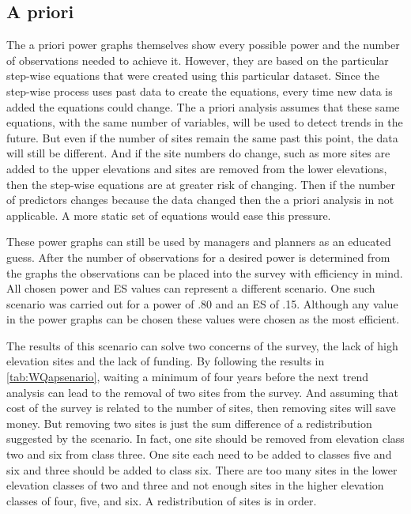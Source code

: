 \subsection{A priori}%

The a priori power graphs themselves show every possible power and the number of observations needed to achieve it.
However, they are based on the particular step-wise equations that were created using this particular dataset.
Since the step-wise process uses past data to create the equations, every time new data is added the equations could change.
The a priori analysis assumes that these same equations, with the same number of variables, will be used to detect trends in the future.
But even if the number of sites remain the same past this point, the data will still be different.
And if the site numbers do change, such as more sites are added to the upper elevations and sites are removed from the lower elevations, then the step-wise equations are at greater risk of changing.
Then if the number of predictors changes because the data changed then the a priori analysis in not applicable.
A more static set of equations would ease this pressure.

These power graphs can still be used by managers and planners as an educated guess.
After the number of observations for a desired power is determined from the graphs the observations can be placed into the survey with efficiency in mind.
All chosen power and ES values can represent a different scenario.
One such scenario was carried out for a power of .80 and an ES of .15.
Although any value in the power graphs can be chosen these values were chosen as the most efficient. 

The results of this scenario can solve two concerns of the survey, the lack of high elevation sites and the lack of funding.
By following the results in \autoref{tab:WQapsenario}, waiting a minimum of four years before the next trend analysis can lead to the removal of two sites from the survey.
And assuming that cost of the survey is related to the number of sites, then removing sites will save money.
But removing two sites is just the sum difference of a redistribution suggested by the scenario.
In fact, one site should be removed from elevation class two and six from class three.
One site each need to be added to classes five and six and three should be added to class six.
There are too many sites in the lower elevation classes of two and three and not enough sites in the higher elevation classes of four, five, and six.
A redistribution of sites is in order.
